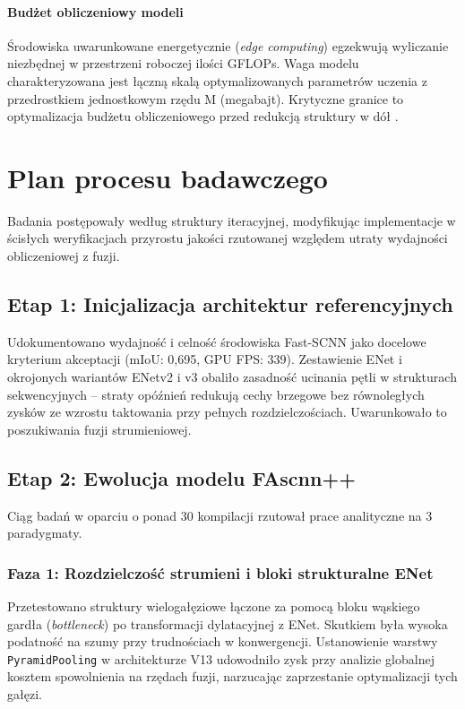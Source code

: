 \paragraph{Budżet obliczeniowy modeli}
Środowiska uwarunkowane energetycznie (\textit{edge computing}) egzekwują wyliczanie niezbędnej w przestrzeni roboczej ilości GFLOPs. Waga modelu charakteryzowana jest łączną skalą optymalizowanych parametrów uczenia z przedrostkiem jednostkowym rzędu M (megabajt). Krytyczne granice to optymalizacja budżetu obliczeniowego przed redukcją struktury w dół .

\section{Plan procesu badawczego}
Badania postępowały według struktury iteracyjnej, modyfikując implementacje w ścisłych weryfikacjach przyrostu jakości rzutowanej względem utraty wydajności obliczeniowej z fuzji.

\subsection{Etap 1: Inicjalizacja architektur referencyjnych}
Udokumentowano wydajność i celność środowiska Fast-SCNN jako docelowe kryterium akceptacji (mIoU: 0,695, GPU FPS: 339). Zestawienie ENet i okrojonych wariantów ENetv2 i v3 obaliło zasadność ucinania pętli w strukturach sekwencyjnych – straty opóźnień redukują cechy brzegowe bez równoległych zysków ze wzrostu taktowania przy pełnych rozdzielczościach. Uwarunkowało to poszukiwania fuzji strumieniowej.

\subsection{Etap 2: Ewolucja modelu FAscnn++}
Ciąg badań w oparciu o ponad 30 kompilacji rzutował prace analityczne na 3 paradygmaty.

\subsubsection{Faza 1: Rozdzielczość strumieni i bloki strukturalne ENet}
Przetestowano struktury wielogałęziowe łączone za pomocą bloku wąskiego gardła (\textit{bottleneck}) po transformacji dylatacyjnej z ENet. Skutkiem była wysoka podatność na szumy przy trudnościach w konwergencji. Ustanowienie warstwy \texttt{PyramidPooling} w architekturze V13 udowodniło zysk przy analizie globalnej kosztem spowolnienia na rzędach fuzji, narzucając zaprzestanie optymalizacji tych gałęzi.

